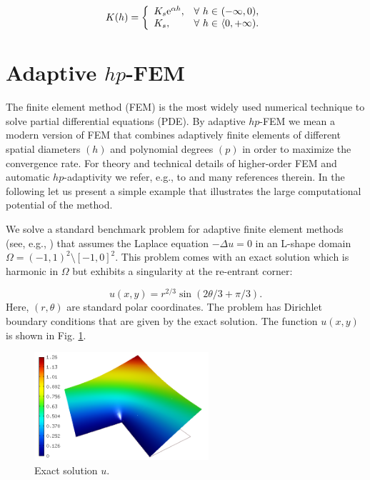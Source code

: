 \documentclass[final,3p,times,twocolumn]{elsarticle}
\begin{document}
  \begin{equation}
  \label{gardner-K}
  K(h) = \left\{
    \begin{array}{l l}
    K_s \textrm{e}^{\alpha h},  &  \mbox{$\forall$  $h \in$ $(-\infty,0)$},\\
    K_s, & \mbox{$\forall$   $h \in$ $\langle 0, +\infty)$}.
    \end{array} \right.
    \end{equation}




\section{Adaptive $hp$-FEM}
\label{sec:hpfem}

The finite element method (FEM) is the most widely used numerical technique
to solve partial differential equations (PDE). 
By adaptive $hp$-FEM we mean a modern version of FEM that combines
adaptively finite elements of different spatial diameters $(h)$ and polynomial
degrees $(p)$ in order to maximize the convergence rate.
For theory and technical details of higher-order FEM
and automatic $hp$-adaptivity we refer, e.g., to \cite{sosedo} 
and many references therein. In the following let us present
a simple example that illustrates the large computational potential of 
the method. 

We solve a standard benchmark problem for adaptive finite element 
methods (see, e.g., \cite{sode}) that 
assumes the Laplace equation $-\Delta u = 0$ in an L-shape domain
$\Omega = (-1, 1)^2 \setminus [-1, 0]^2$. This problem comes with an exact 
solution which is harmonic in $\Omega$ but exhibits a singularity at the 
re-entrant corner:

$$
u(x,y) = r^{2/3} \sin(2 \theta / 3 + \pi / 3).
$$
Here, $(r, \theta)$ are standard polar coordinates. The problem has 
Dirichlet boundary conditions that are given by the exact solution. 
The function $u(x, y)$ is shown in Fig. \ref{fig:lshape-exact}. 


\begin{figure}[!ht]
\begin{center}
\includegraphics[height=4cm]{lshape-exact.png}
\end{center}
\vspace{-4mm}
\caption{Exact solution $u$.}
\label{fig:lshape-exact}
\end{figure}
\end{document}
